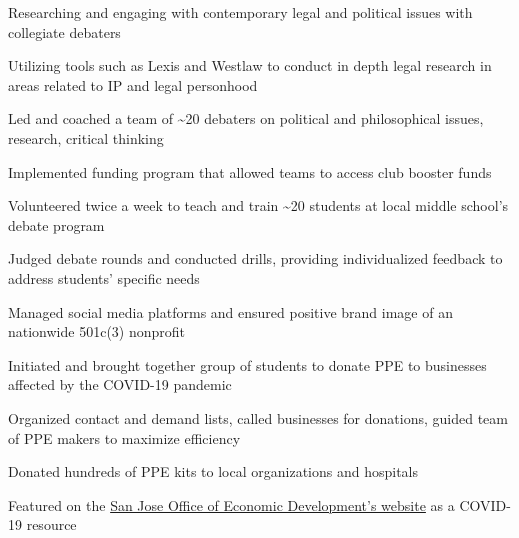 \documentclass[letterpaper]{resume-shreeram}
\begin{document}
\begin{compactitem}
  \item Researching and engaging with contemporary legal and political
    issues with collegiate debaters

  \item Utilizing tools such as Lexis and Westlaw to conduct in depth
    legal research in areas related to IP and legal personhood
\end{compactitem}

\begin{compactitem}
    \item Led and coached a team of \textasciitilde{}20 debaters on
      political and philosophical issues, research, critical thinking

    \item Implemented funding program that allowed teams to access club booster
      funds
\end{compactitem}

\begin{compactitem}
    \item Volunteered twice a week to teach and train \textasciitilde{}20
      students at local middle school's debate program

    \item Judged debate rounds and conducted drills, providing
      individualized feedback to address students' specific needs
\end{compactitem}

\begin{compactitem}
    \item Managed social media platforms and ensured positive brand
      image of an nationwide 501c(3) nonprofit
\end{compactitem}

\begin{compactitem}
    \item Initiated and brought together group of students to donate PPE
      to businesses affected by the COVID-19 pandemic

    \item Organized contact and demand lists, called businesses for
      donations, guided team of PPE makers to maximize efficiency

    \item Donated hundreds of PPE kits to local organizations and
      hospitals

    \item Featured on the
      \href{https://www.sjeconomy.com/why-san-jose/covid-19-guidance/local-suppliers}{San
      Jose Office of Economic Development's website} as a COVID-19
      resource
\end{compactitem}
\end{document}

